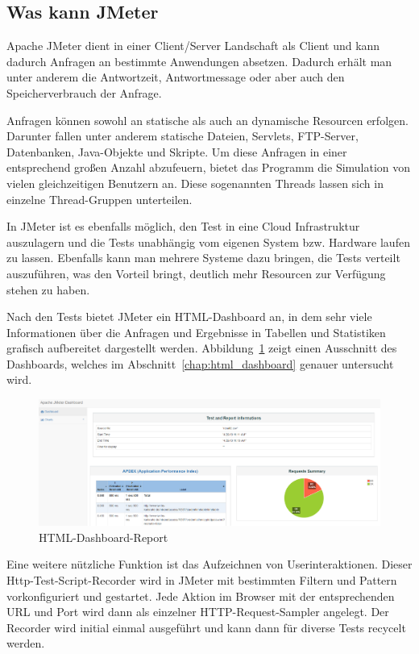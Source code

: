 \documentclass[a4paper,12pt]{article}
\begin{document}
\subsection{Was kann JMeter}
Apache JMeter dient in einer Client/Server Landschaft als Client und kann dadurch Anfragen an bestimmte Anwendungen absetzen. Dadurch erhält man unter anderem die Antwortzeit, Antwortmessage oder aber auch den Speicherverbrauch der Anfrage.

Anfragen können sowohl an statische als auch an dynamische Resourcen erfolgen. Darunter fallen unter anderem statische Dateien, Servlets, FTP-Server, Datenbanken, Java-Objekte und Skripte.
Um diese Anfragen in einer entsprechend großen Anzahl abzufeuern, bietet das Programm die Simulation von vielen gleichzeitigen Benutzern an. Diese sogenannten Threads lassen sich in einzelne Thread-Gruppen unterteilen.

In JMeter ist es ebenfalls möglich, den Test in eine Cloud Infrastruktur auszulagern und die Tests unabhängig vom eigenen System bzw. Hardware laufen zu lassen. Ebenfalls kann man mehrere Systeme dazu bringen, die Tests verteilt auszuführen, was den Vorteil bringt, deutlich mehr Resourcen zur Verfügung stehen zu haben. 

Nach den Tests bietet JMeter ein HTML-Dashboard an, in dem sehr viele Informationen über die Anfragen und Ergebnisse in Tabellen und Statistiken grafisch aufbereitet dargestellt werden. Abbildung~\ref{fig:dashboard} zeigt einen Ausschnitt des Dashboards, welches im Abschnitt~\ref{chap:html_dashboard} genauer untersucht wird.  

\begin{figure}[htb]%
 \centering
    \includegraphics[width=1\textwidth]{bilder/dashboard.png}
  \caption{HTML-Dashboard-Report}
  \label{fig:dashboard}
\end{figure}

Eine weitere nützliche Funktion ist das Aufzeichnen von Userinteraktionen. Dieser Http-Test-Script-Recorder wird in JMeter mit bestimmten Filtern und Pattern vorkonfiguriert und gestartet. Jede Aktion im Browser mit der entsprechenden URL und Port wird dann als einzelner HTTP-Request-Sampler angelegt. Der Recorder wird initial einmal ausgeführt und kann dann für diverse Tests recycelt werden.    
\end{document}
